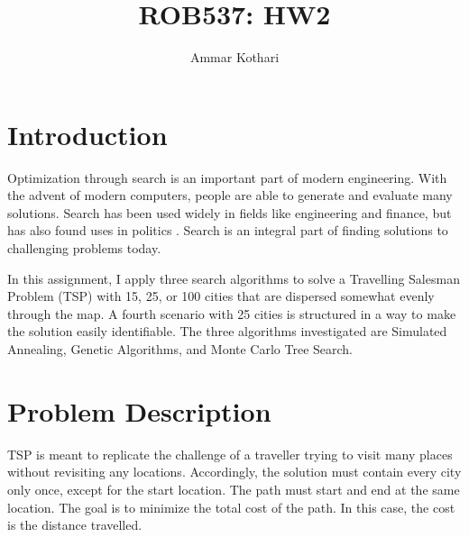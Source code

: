 \documentclass[a4paper]{article}
\title{ROB537: HW2}
\author{Ammar Kothari}
\begin{document}
\maketitle

\section{Introduction}
Optimization through search is an important part of modern engineering.  With the advent of modern computers, people are able to generate and evaluate many solutions.  Search has been used widely in fields like engineering and finance, but has also found uses in politics \cite{totenberg_2017}.  Search is an integral part of finding solutions to challenging problems today.

In this assignment, I apply three search algorithms to solve a Travelling Salesman Problem (TSP) with 15, 25, or 100 cities that are dispersed somewhat evenly through the map.  A fourth scenario with 25 cities is structured in a way to make the solution easily identifiable.  The three algorithms investigated are Simulated Annealing, Genetic Algorithms, and Monte Carlo Tree Search.

\section{Problem Description}
TSP is meant to replicate the challenge of a traveller trying to visit many places without revisiting any locations.  Accordingly, the solution must contain every city only once, except for the start location.  The path must start and end at the same location.  The goal is to minimize the total cost of the path.  In this case, the cost is the distance travelled.







% 

% 



\end{document}
